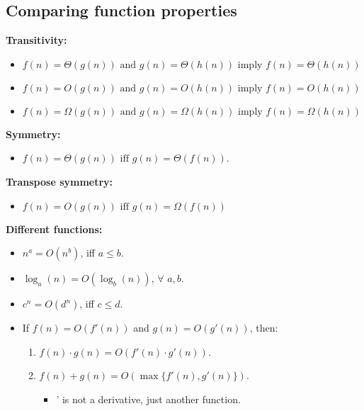 \subsection{Comparing function properties}
    \begin{definition}
        
        \textbf{Transitivity:}
        \begin{itemize}
            \item $f(n) = \Theta(g(n)) \text{ and } g(n)=\Theta(h(n)) \text{ imply } f(n) = \Theta(h(n))$
            \item $f(n) = O(g(n)) \text{ and } g(n)=O(h(n)) \text{ imply } f(n) = O(h(n))$
            \item $f(n) = \Omega(g(n)) \text{ and } g(n)=\Omega(h(n)) \text{ imply } f(n) = \Omega(h(n))$
        \end{itemize}
        \vspace{1em}

        \textbf{Symmetry:}
        \begin{itemize}
            \item $f(n) = \Theta(g(n)) \text{ iff } g(n) = \Theta(f(n))$.
        \end{itemize}
        \vspace{1em}

        \textbf{Transpose symmetry:}
        \begin{itemize}
            \item $f(n) = O(g(n)) \text{ iff } g(n) = \Omega(f(n))$
        \end{itemize}
        \vspace{1em}

        \textbf{Different functions:}
        \begin{itemize}
            \item \( n^a = O(n^b) \), iff \( a \leq b \).
            \item \( \log_a(n) = O(\log_b(n)) \), $\forall$ \( a, b \).
            \item \( c^n = O(d^n) \), iff \( c \leq d \).
            \item If \( f(n) = O(f'(n)) \) and \( g(n) = O(g'(n)) \), then:
            \begin{enumerate}
                \item \( f(n) \cdot g(n) = O(f'(n) \cdot g'(n)) \).
                \item \( f(n) + g(n) = O(\max\{f'(n), g'(n)\}) \).
                \begin{itemize}
                    \item ' is not a derivative, just another function. 
                \end{itemize}
            \end{enumerate}
        \end{itemize}
        
    \end{definition}

